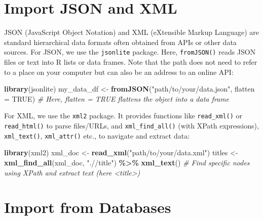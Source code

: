 \documentclass[
]{book}
\newenvironment{Shaded}{\begin{snugshade}}{\end{snugshade}}
\newcommand{\AttributeTok}[1]{\textcolor[rgb]{0.13,0.29,0.53}{#1}}
\newcommand{\CommentTok}[1]{\textcolor[rgb]{0.56,0.35,0.01}{\textit{#1}}}
\newcommand{\ConstantTok}[1]{\textcolor[rgb]{0.56,0.35,0.01}{#1}}
\newcommand{\FunctionTok}[1]{\textcolor[rgb]{0.13,0.29,0.53}{\textbf{#1}}}
\newcommand{\NormalTok}[1]{#1}
\newcommand{\OtherTok}[1]{\textcolor[rgb]{0.56,0.35,0.01}{#1}}
\newcommand{\SpecialCharTok}[1]{\textcolor[rgb]{0.81,0.36,0.00}{\textbf{#1}}}
\newcommand{\StringTok}[1]{\textcolor[rgb]{0.31,0.60,0.02}{#1}}
\begin{document}
\section{Import JSON and XML}\label{import-json-and-xml}

JSON (JavaScript Object Notation) and XML (eXtensible Markup Language) are standard hierarchical data formats often obtained from APIs or other data sources. For JSON, we use the \texttt{jsonlite} package. Here, \texttt{fromJSON()} reads JSON files or text into R lists or data frames. Note that the path does not need to refer to a place on your computer but can also be an address to an online API:

\begin{Shaded}
\begin{Highlighting}[]
\FunctionTok{library}\NormalTok{(jsonlite)}
\NormalTok{my\_data\_df }\OtherTok{\textless{}{-}} \FunctionTok{fromJSON}\NormalTok{(}\StringTok{"path/to/your/data.json"}\NormalTok{, }\AttributeTok{flatten =} \ConstantTok{TRUE}\NormalTok{)  }\CommentTok{\# Here, \textasciigrave{}\textasciigrave{}flatten = TRUE\textasciigrave{}\textasciigrave{} flattens the object into a data frame}
\end{Highlighting}
\end{Shaded}

For XML, we use the \texttt{xml2} package. It provides functions like \texttt{read\_xml()} or \texttt{read\_html()} to parse files/URLs, and \texttt{xml\_find\_all()} (with XPath expressions), \texttt{xml\_text()}, \texttt{xml\_attr()} etc., to navigate and extract data:

\begin{Shaded}
\begin{Highlighting}[]
\FunctionTok{library}\NormalTok{(xml2)}
\NormalTok{xml\_doc }\OtherTok{\textless{}{-}} \FunctionTok{read\_xml}\NormalTok{(}\StringTok{"path/to/your/data.xml"}\NormalTok{)}
\NormalTok{titles }\OtherTok{\textless{}{-}} \FunctionTok{xml\_find\_all}\NormalTok{(xml\_doc, }\StringTok{".//title"}\NormalTok{) }\SpecialCharTok{\%\textgreater{}\%}
    \FunctionTok{xml\_text}\NormalTok{()  }\CommentTok{\# Find specific nodes using XPath and extract text (here \textless{}title\textgreater{})}
\end{Highlighting}
\end{Shaded}

\section{Import from Databases}\label{import-from-databases}
\end{document}
